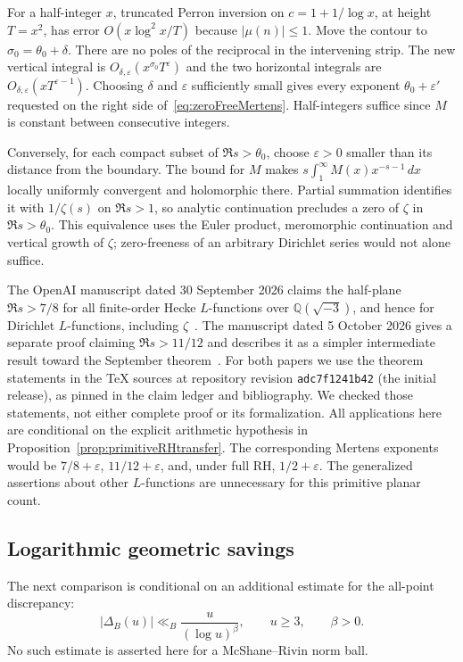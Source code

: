 For a half-integer $x$, truncated Perron inversion on
$c=1+1/\log x$, at height $T=x^2$, has error
$O(x\log^2x/T)$ because $|\mu(n)|\le1$. Move the contour to
$\sigma_0=\theta_0+\delta$. There are no poles of the reciprocal in
the intervening strip. The new vertical integral is
$O_{\delta,\varepsilon}(x^{\sigma_0}T^\varepsilon)$ and the two
horizontal integrals are $O_{\delta,\varepsilon}(xT^{\varepsilon-1})$.
Choosing $\delta$ and $\varepsilon$ sufficiently small gives every
exponent $\theta_0+\varepsilon'$ requested on the right side
of~\eqref{eq:zeroFreeMertens}. Half-integers suffice since $M$ is
constant between consecutive integers.

Conversely, for each compact subset of $\Re s>\theta_0$, choose
$\varepsilon>0$ smaller than its distance from the boundary. The bound
for $M$ makes $s\int_1^\infty M(x)x^{-s-1}\,dx$ locally uniformly
convergent and holomorphic there. Partial summation identifies it with
$1/\zeta(s)$ on $\Re s>1$, so analytic continuation precludes a zero
of $\zeta$ in $\Re s>\theta_0$. This equivalence uses the Euler product,
meromorphic continuation and vertical growth of $\zeta$; zero-freeness
of an arbitrary Dirichlet series would not alone suffice.

The OpenAI manuscript dated 30 September 2026 claims the half-plane
$\Re s>7/8$ for all finite-order Hecke $L$-functions over
$\mathbb Q(\sqrt{-3})$, and hence for Dirichlet $L$-functions,
including $\zeta$~\cite[Theorem~1.1]{OpenAIQuasiRHSeptember}.
The manuscript dated 5 October 2026 gives a separate proof claiming
$\Re s>11/12$ and describes it as a simpler intermediate result toward
the September theorem~\cite[Theorem~1.1 and the following paragraph]{OpenAIQuasiRHOctober}.
For both papers we use the theorem statements in the TeX sources at
repository revision \texttt{adc7f1241b42} (the initial release), as pinned
in the claim ledger and bibliography. We checked those statements,
not either complete proof or its formalization. All applications here are conditional on
the explicit arithmetic hypothesis in Proposition~\ref{prop:primitiveRHtransfer}.
The corresponding Mertens exponents would be $7/8+\varepsilon$,
$11/12+\varepsilon$, and, under full RH, $1/2+\varepsilon$.
The generalized assertions about other $L$-functions are unnecessary
for this primitive planar count.

\subsection{Logarithmic geometric savings}
The next comparison is conditional on an additional estimate for the
all-point discrepancy:
\begin{equation}\label{eq:primitiveRHgeometry}
 |\Delta_B(u)|\ll_B\frac{u}{(\log u)^\beta},\qquad u\ge3,
 \qquad\beta>0.
\end{equation}
No such estimate is asserted here for a McShane--Rivin norm ball.

